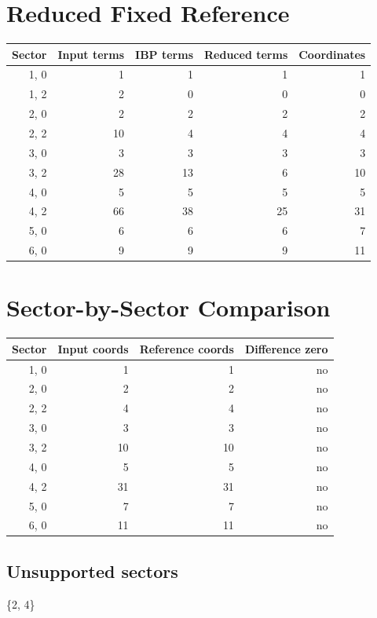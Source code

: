 \documentclass[11pt]{article}
\begin{document}
\section{Reduced Fixed Reference}
\begin{longtable}{rrrrr}
\toprule
Sector & Input terms & IBP terms & Reduced terms & Coordinates \\
\midrule
{1, 0} & 1 & 1 & 1 & 1 \\
{1, 2} & 2 & 0 & 0 & 0 \\
{2, 0} & 2 & 2 & 2 & 2 \\
{2, 2} & 10 & 4 & 4 & 4 \\
{3, 0} & 3 & 3 & 3 & 3 \\
{3, 2} & 28 & 13 & 6 & 10 \\
{4, 0} & 5 & 5 & 5 & 5 \\
{4, 2} & 66 & 38 & 25 & 31 \\
{5, 0} & 6 & 6 & 6 & 7 \\
{6, 0} & 9 & 9 & 9 & 11 \\
\bottomrule
\end{longtable}
\section{Sector-by-Sector Comparison}
\begin{longtable}{rrrr}
\toprule
Sector & Input coords & Reference coords & Difference zero \\
\midrule
{1, 0} & 1 & 1 & no \\
{2, 0} & 2 & 2 & no \\
{2, 2} & 4 & 4 & no \\
{3, 0} & 3 & 3 & no \\
{3, 2} & 10 & 10 & no \\
{4, 0} & 5 & 5 & no \\
{4, 2} & 31 & 31 & no \\
{5, 0} & 7 & 7 & no \\
{6, 0} & 11 & 11 & no \\
\bottomrule
\end{longtable}
\subsection{Unsupported sectors}
\{2, 4\}
\end{document}
